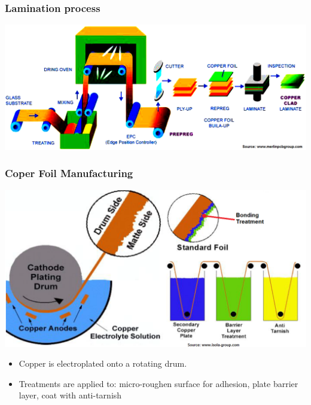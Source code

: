 \documentclass{beamer}
\begin{document}
	\begin{frame}
    \frametitle{Lamination process}
		\small
		\begin{center}
			\includegraphics[scale=0.3]{obr28_laminace.png}
		\end{center}
	\end{frame}
	\begin{frame}
    \frametitle{Coper Foil Manufacturing}

		\begin{center}
			\includegraphics[scale=0.25]{obr24_Cu.png}
		\end{center}
		
		\begin{itemize}
			\item Copper is electroplated onto a rotating drum.
			\item Treatments are applied to: micro-roughen surface for adhesion, plate barrier layer, coat with anti-tarnish
		\end{itemize}
	\end{frame}
\end{document}
